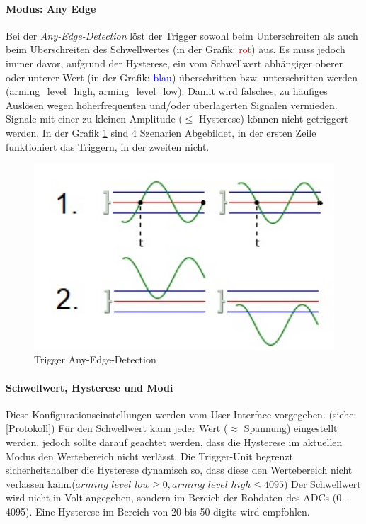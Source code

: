 \paragraph{Modus: Any Edge}
Bei der \textit{Any-Edge-Detection} löst der Trigger sowohl beim Unterschreiten als auch beim Überschreiten des Schwellwertes (in der Grafik: \textcolor{red}{rot}) aus. Es muss jedoch immer davor, aufgrund der Hysterese, ein vom Schwellwert abhängiger oberer oder unterer Wert (in der Grafik: \textcolor{blue}{blau}) überschritten bzw. unterschritten werden (arming\_level\_high, arming\_level\_low). Damit wird falsches, zu häufiges Auslösen wegen höherfrequenten und/oder überlagerten Signalen vermieden. Signale mit einer zu kleinen Amplitude ($\leq$ Hysterese) können nicht getriggert werden. In der Grafik \ref{anyEdge} sind 4 Szenarien Abgebildet, in der ersten Zeile funktioniert das Triggern, in der zweiten nicht.
\begin{figure}[h]
	\begin{center}
		\includegraphics[width=15cm]{SAUER/Grafiken/Trigger/TriggerEdgeAny.jpg}
		\caption{Trigger Any-Edge-Detection}
		\label{anyEdge}
	\end{center}
\end{figure}
\paragraph{Schwellwert, Hysterese und Modi}
Diese Konfigurationseinstellungen werden vom User-Interface vorgegeben. (siehe: \ref{Protokoll}) Für den Schwellwert kann jeder Wert ($\approx$ Spannung) eingestellt werden, jedoch sollte darauf geachtet werden, dass die Hysterese im aktuellen Modus den Wertebereich nicht verlässt. Die Trigger-Unit begrenzt sicherheitshalber die Hysterese dynamisch so, dass diese den Wertebereich nicht verlassen kann.($arming\_level\_low \geq 0, arming\_level\_high \leq 4095$) Der Schwellwert wird nicht in Volt angegeben, sondern im Bereich der Rohdaten des ADCs (0 - 4095).
Eine Hysterese im Bereich von 20 bis 50 digits wird empfohlen.
